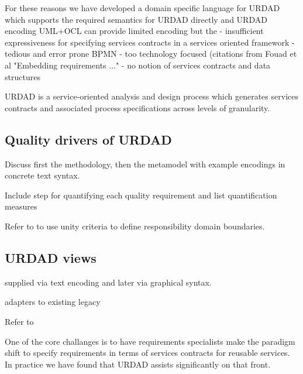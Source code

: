For these reasons we have developed a domain specific language for URDAD which supports the required semantics for URDAD directly and
URDAD encoding
UML+OCL can provide limited encoding but the
  - insufficient expressiveness for specifying services contracts in a services oriented framework
  - tedious and error prone
BPMN
  - too technology focused (citations from Fouad et al "Embedding requirements ..."
  - no notion of services contracts and data structures  

URDAD is a service-oriented analysis and design process which generates services contracts and associated process specifications across levels of granularity. 

\subsection{Quality drivers of URDAD}

Discuss first the methodology, then the metamodel with example encodings in concrete text syntax.


Include step for quantifying each quality requirement and list quantification measures

Refer to \cite{gonzalez_unity_2009} to use unity criteria to define responsibility domain boundaries.




\subsection{URDAD views}

supplied via text encoding and later via graphical syntax.


adapters to existing legacy


Refer to \cite{wirfs-brock_object-oriented_1989}

One of the core challanges is to have requirements specialists make the paradigm shift to specify requirements in terms of services contracts for reusable services\cite{haines_impact_2007}. In practice we have found that URDAD assists significantly on that front.
